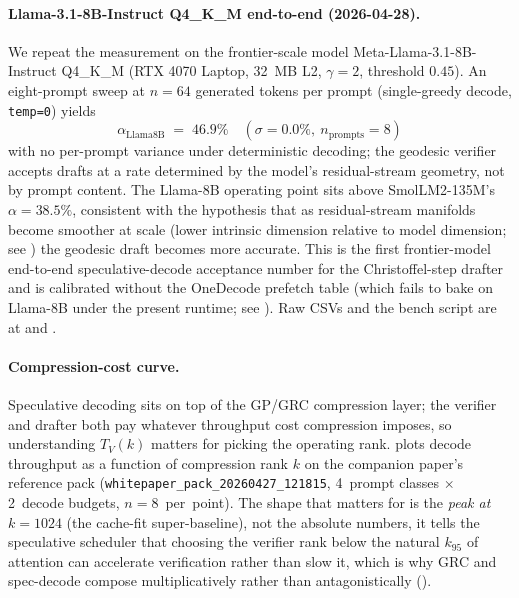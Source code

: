 \documentclass[11pt]{article}
\begin{document}
\paragraph{Llama-3.1-8B-Instruct Q4\_K\_M end-to-end (2026-04-28).}
We repeat the measurement on the frontier-scale model
Meta-Llama-3.1-8B-Instruct Q4\_K\_M (RTX 4070 Laptop, 32~MB L2,
$\gamma{=}2$, threshold $0.45$).  An eight-prompt sweep at $n{=}64$
generated tokens per prompt (single-greedy decode, \texttt{temp=0}) yields
\[
\alpha_\text{Llama8B} \;=\; \mathbf{46.9\%}\quad
(\sigma\!=\!0.0\%,\ n_\text{prompts}{=}8)
\]
with no per-prompt variance under deterministic decoding;
the geodesic verifier accepts drafts at a rate determined by the
model's residual-stream geometry, not by prompt content.
The Llama-8B operating point sits above SmolLM2-135M's
$\alpha{=}38.5\%$, consistent with the hypothesis that as residual-stream
manifolds become smoother at scale (lower intrinsic dimension relative
to model dimension; see ) the geodesic draft becomes more
accurate.  This is the first frontier-model end-to-end speculative-decode
acceptance number for the Christoffel-step drafter and is calibrated
without the OneDecode prefetch table (which fails to bake on Llama-8B
under the present runtime; see ).
Raw CSVs and the bench script are at
 and
.

\paragraph{Compression-cost curve.}
Speculative decoding sits on top of the GP/GRC compression layer; the
verifier and drafter both pay whatever throughput cost compression imposes,
so understanding $T_V(k)$ matters for picking the operating rank.
 plots decode throughput as a function of
compression rank $k$ on the companion paper's reference pack
(\texttt{whitepaper\_pack\_20260427\_121815}, 4~prompt classes $\times$
2~decode budgets, $n{=}8$~per~point).  The shape that matters for
 is the \emph{peak at $k{=}1024$} (the cache-fit super-baseline),
not the absolute numbers, it tells the speculative scheduler that
choosing the verifier rank below the natural $k_{95}$ of attention can
accelerate verification rather than slow it, which is why GRC and
spec-decode compose multiplicatively rather than antagonistically
().
\end{document}
